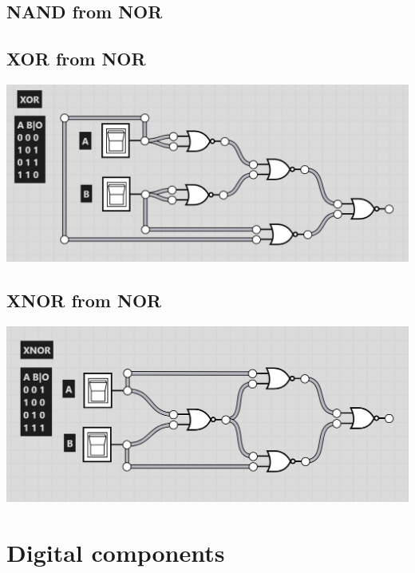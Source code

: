 \documentclass[11pt]{book}
\begin{document}
\subsection{NAND from NOR}


\subsection{XOR from NOR}

\includegraphics[width=\textwidth]{figures/XOR.jpg}

\subsection{XNOR from NOR}

\includegraphics[width=\textwidth]{figures/XNOR.jpg}

\newpage
\section{Digital components}
\end{document}
